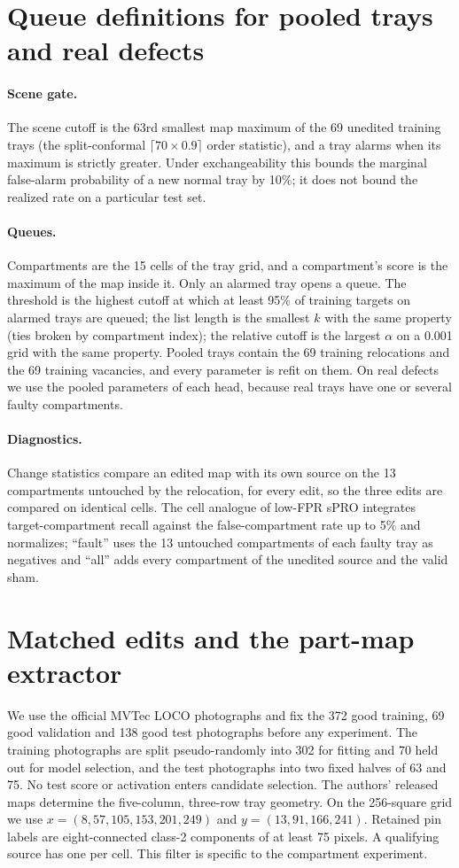 \section{Queue definitions for pooled trays and real defects}
\label{sec:supp_queue}
\label{sec:supp_defs}
\paragraph{Scene gate.} The scene cutoff is the 63rd smallest map maximum of the 69 unedited training trays (the split-conformal $\lceil 70\times0.9\rceil$ order statistic), and a tray alarms when its maximum is strictly greater. Under exchangeability this bounds the marginal false-alarm probability of a new normal tray by 10\%; it does not bound the realized rate on a particular test set.
\paragraph{Queues.} Compartments are the 15 cells of the tray grid, and a compartment's score is the maximum of the map inside it. Only an alarmed tray opens a queue. The threshold is the highest cutoff at which at least 95\% of training targets on alarmed trays are queued; the list length is the smallest $k$ with the same property (ties broken by compartment index); the relative cutoff is the largest $\alpha$ on a 0.001 grid with the same property. Pooled trays contain the 69 training relocations and the 69 training vacancies, and every parameter is refit on them. On real defects we use the pooled parameters of each head, because real trays have one or several faulty compartments.
\paragraph{Diagnostics.} Change statistics compare an edited map with its own source on the 13 compartments untouched by the relocation, for every edit, so the three edits are compared on identical cells. The cell analogue of low-FPR sPRO integrates target-compartment recall against the false-compartment rate up to 5\% and normalizes; ``fault'' uses the 13 untouched compartments of each faulty tray as negatives and ``all'' adds every compartment of the unedited source and the valid sham.
\section{Matched edits and the part-map extractor}
\label{sec:supp_photo}
We use the official MVTec LOCO photographs and fix the 372 good training, 69 good validation and 138 good test photographs before any experiment. The training photographs are split pseudo-randomly into 302 for fitting and 70 held out for model selection, and the test photographs into two fixed halves of 63 and 75. No test score or activation enters candidate selection. The authors' released maps determine the five-column, three-row tray geometry. On the 256-square grid we use $x=(8,57,105,153,201,249)$ and $y=(13,91,166,241)$. Retained pin labels are eight-connected class-2 components of at least 75 pixels. A qualifying source has one per cell. This filter is specific to the compartment experiment.


